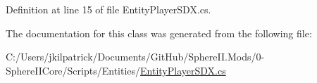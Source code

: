 Definition at line 15 of file Entity\+Player\+S\+D\+X.\+cs.



The documentation for this class was generated from the following file\+:\begin{DoxyCompactItemize}
\item 
C\+:/\+Users/jkilpatrick/\+Documents/\+Git\+Hub/\+Sphere\+I\+I.\+Mods/0-\/\+Sphere\+I\+I\+Core/\+Scripts/\+Entities/\mbox{\hyperlink{_entity_player_s_d_x_8cs}{Entity\+Player\+S\+D\+X.\+cs}}\end{DoxyCompactItemize}
